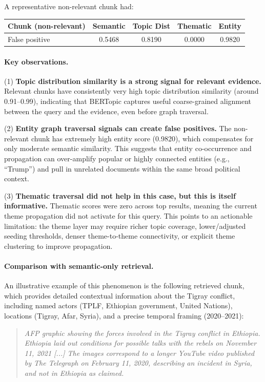 \documentclass[10pt]{article}
\begin{document}
A representative non-relevant chunk had:

\begin{center}
\begin{tabular}{lcccc}
\toprule
Chunk (non-relevant) & Semantic & Topic Dist & Thematic & Entity \\
\midrule
False positive & 0.5468 & 0.8190 & 0.0000 & 0.9820 \\
\bottomrule
\end{tabular}
\end{center}

\paragraph{Key observations.}
(1) \textbf{Topic distribution similarity is a strong signal for relevant evidence.} Relevant chunks have consistently very high topic distribution similarity (around 0.91--0.99), indicating that BERTopic captures useful coarse-grained alignment between the query and the evidence, even before graph traversal.

(2) \textbf{Entity graph traversal signals can create false positives.} The non-relevant chunk has extremely high entity score (0.9820), which compensates for only moderate semantic similarity. This suggests that entity co-occurrence and propagation can over-amplify popular or highly connected entities (e.g., ``Trump'') and pull in unrelated documents within the same broad political context.

(3) \textbf{Thematic traversal did not help in this case, but this is itself informative.} Thematic scores were zero across top results, meaning the current theme propagation did not activate for this query. This points to an actionable limitation: the theme layer may require richer topic coverage, lower/adjusted seeding thresholds, denser theme-to-theme connectivity, or explicit theme clustering to improve propagation.

\paragraph{Comparison with semantic-only retrieval.}
An illustrative example of this phenomenon is the following retrieved chunk, which provides detailed contextual information about the Tigray conflict, including named actors (TPLF, Ethiopian government, United Nations), locations (Tigray, Afar, Syria), and a precise temporal framing (2020--2021):

\begin{quote}
\small
\emph{AFP graphic showing the forces involved in the Tigray conflict in Ethiopia. Ethiopia laid out conditions for possible talks with the rebels on November 11, 2021 [...] The images correspond to a longer YouTube video published by The Telegraph on February 11, 2020, describing an incident in Syria, and not in Ethiopia as claimed.}
\end{quote}
\end{document}
